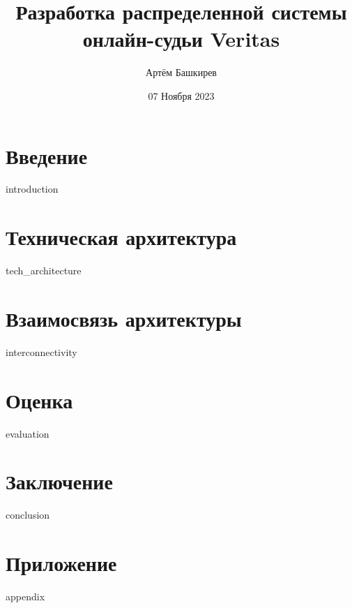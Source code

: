 \documentclass{article}
\title{Разработка распределенной системы онлайн-судьи Veritas}
\author{Артём Башкирев}
\date{07 Ноября 2023}
\begin{document}
\maketitle

\newpage
    \tableofcontents
\newpage

\newpage
    \section{Введение}
    {introduction}
\newpage
    \section{Техническая архитектура}
    {tech_architecture}
\newpage
    \section{Взаимосвязь архитектуры}
    {interconnectivity}
\newpage
    \section{Оценка}
    {evaluation}
\newpage
    \section{Заключение}
    {conclusion}
\newpage
    \section{Приложение}
    {appendix}
\newpage
\end{document}
